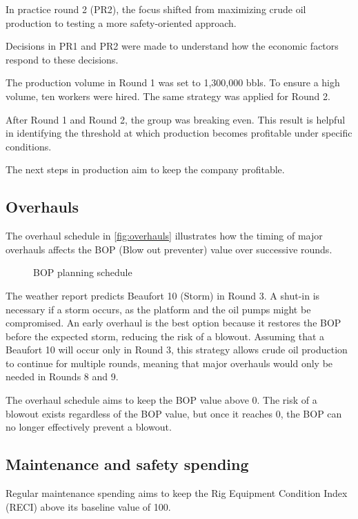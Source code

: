 \documentclass{article}
\begin{document}
In practice round 2 (PR2), the focus shifted from maximizing crude oil
production to testing a more safety-oriented approach.

Decisions in PR1 and PR2 were made to understand how the economic factors
respond to these decisions.

The production volume in Round 1 was set to 1,300,000 bbls. To ensure a
high volume, ten workers were hired. The same strategy was applied
for Round 2.

After Round 1 and Round 2, the group was breaking even.
This result is helpful in identifying the threshold at which production
becomes profitable under specific conditions.

The next steps in production aim to keep the company profitable.

\subsection*{Overhauls}
The overhaul schedule in \autoref{fig:overhauls} illustrates how the
timing of major overhauls affects the BOP (Blow out preventer) value over successive rounds.
\begin{figure}[H]
    \centering
    \resizebox{.9\linewidth}{!}{}
    \caption{BOP planning schedule}
    \label{fig:overhauls}
\end{figure}

The weather report predicts Beaufort 10 (Storm) in Round 3.
A shut-in is necessary if a storm occurs, as the platform and the oil pumps might
be compromised. An early overhaul is the best option
because it restores the BOP before the expected storm, reducing the risk of a blowout.
Assuming that a Beaufort 10 will occur only in Round 3, this strategy allows
crude oil production to continue for multiple rounds, meaning that major overhauls
would only be needed in Rounds 8 and 9.

The overhaul schedule aims to keep the BOP value above 0. The risk of a blowout
exists regardless of the BOP value, but once it reaches 0, the BOP can no longer
effectively prevent a blowout.

\subsection*{Maintenance and safety spending}
Regular maintenance spending aims to keep the Rig Equipment Condition Index
(RECI) above its baseline value of 100.
\end{document}
